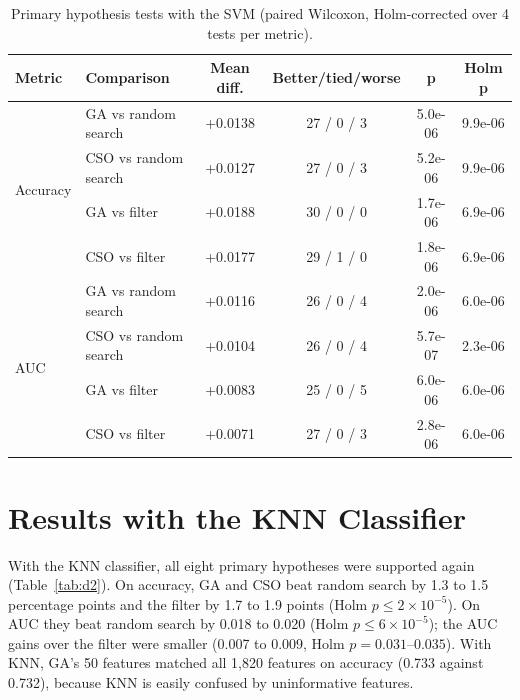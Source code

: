 \documentclass[12pt,a4paper]{report}
\begin{document}
\begin{table}[H]
\centering
\caption{Primary hypothesis tests with the SVM (paired Wilcoxon, Holm-corrected over 4 tests per metric).}
\label{tab:d1tests}
\footnotesize
\begin{tabular}{|l|l|c|c|c|c|}
\hline
\textbf{Metric} & \textbf{Comparison} & \textbf{Mean diff.} & \textbf{Better/tied/worse} & \textbf{p} & \textbf{Holm p} \\
\hline
\multirow{4}{*}{Accuracy} & GA vs random search & +0.0138 & 27 / 0 / 3 & 5.0e-06 & 9.9e-06 \\
 & CSO vs random search & +0.0127 & 27 / 0 / 3 & 5.2e-06 & 9.9e-06 \\
 & GA vs filter & +0.0188 & 30 / 0 / 0 & 1.7e-06 & 6.9e-06 \\
 & CSO vs filter & +0.0177 & 29 / 1 / 0 & 1.8e-06 & 6.9e-06 \\
\hline
\multirow{4}{*}{AUC} & GA vs random search & +0.0116 & 26 / 0 / 4 & 2.0e-06 & 6.0e-06 \\
 & CSO vs random search & +0.0104 & 26 / 0 / 4 & 5.7e-07 & 2.3e-06 \\
 & GA vs filter & +0.0083 & 25 / 0 / 5 & 6.0e-06 & 6.0e-06 \\
 & CSO vs filter & +0.0071 & 27 / 0 / 3 & 2.8e-06 & 6.0e-06 \\
\hline
\end{tabular}
\end{table}

\section{Results with the KNN Classifier}
With the KNN classifier, all eight primary hypotheses were supported again (Table~\ref{tab:d2}). On accuracy, GA and
CSO beat random search by 1.3 to 1.5 percentage points and the filter by 1.7 to 1.9 points (Holm $p \le 2\times10^{-5}$).
On AUC they beat random search by 0.018 to 0.020 (Holm $p \le 6\times10^{-5}$); the AUC gains over the filter were
smaller (0.007 to 0.009, Holm $p = 0.031$--$0.035$). With KNN, GA's 50 features matched all 1,820 features on
accuracy (0.733 against 0.732), because KNN is easily confused by uninformative features.
\end{document}
